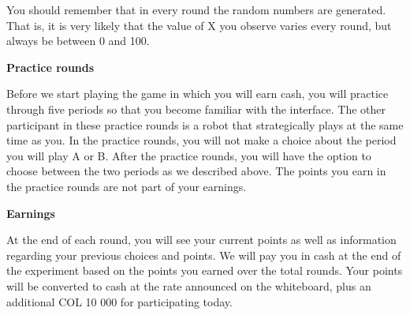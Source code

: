 \documentclass[12pt, letterpaper]{article}
\theoremstyle{plain}
\begin{document}
You should remember that in every round the random numbers are generated. That is, it is very likely that the value of X you observe varies every round, but always be between 0 and 100. 

\noindent \textbf{Practice rounds}

Before we start playing the game in which you will earn cash, you will practice through five periods so that you become familiar with the interface. The other participant in these practice rounds is a robot that strategically plays at the same time as you. In the practice rounds, you will not make a choice about the period you will play A or B. After the practice rounds, you will have the option to choose between the two periods as we described above. The points you earn in the practice rounds are not part of your earnings.


\noindent \textbf{Earnings}

At the end of each round, you will see your current points as well as information regarding your previous choices and points.  We will pay you in cash at the end of the experiment based on the points you earned over the total rounds. Your points will be converted to cash at the rate announced on the whiteboard, plus an additional COL 10 000 for participating today. 
\end{document}

